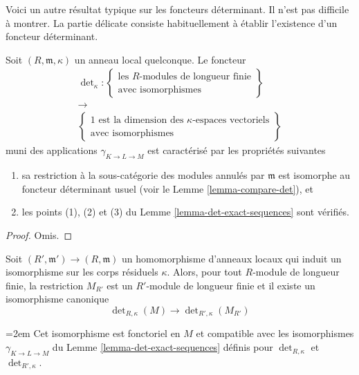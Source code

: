 \medskip\noindent
Voici un autre résultat typique sur les foncteurs déterminant.
Il n'est pas difficile à montrer. La partie délicate consiste habituellement à établir
l'existence d'un foncteur déterminant.

\begin{lemma}
\label{lemma-uniqueness-det}
Soit $(R, \mathfrak m, \kappa)$ un anneau local quelconque.
Le foncteur
$$
\begin{gathered}
\det\nolimits_\kappa :
\left\{
\begin{matrix}
\text{les }R\text{-modules de longueur finie} \\
\text{avec isomorphismes}
\end{matrix}
\right\} \\
\longrightarrow \\
\left\{
\begin{matrix}
1\text{ est la dimension des }\kappa\text{-espaces vectoriels} \\
\text{avec isomorphismes}
\end{matrix}
\right\}
\end{gathered}
$$
muni des applications $\gamma_{K \to L \to M}$ est caractérisé par
les propriétés suivantes
\begin{enumerate}
\item sa restriction à la sous-catégorie des modules annulés
par $\mathfrak m$ est isomorphe au foncteur déterminant usuel
(voir le Lemme \ref{lemma-compare-det}), et
\item les points (1), (2) et (3) du Lemme \ref{lemma-det-exact-sequences}
sont vérifiés.
\end{enumerate}
\end{lemma}

\begin{proof}
Omis.
\end{proof}

\begin{lemma}
\label{lemma-determinant-quotient-ring}
Soit $(R', \mathfrak m') \to (R, \mathfrak m)$ un homomorphisme d'anneaux
locaux qui induit un isomorphisme sur les corps résiduels $\kappa$.
Alors, pour tout $R$-module de longueur finie, la restriction $M_{R'}$
est un $R'$-module de longueur finie et il existe un isomorphisme canonique
$$
\det\nolimits_{R, \kappa}(M)
\longrightarrow
\det\nolimits_{R', \kappa}(M_{R'})
$$
{\emergencystretch=2em Cet isomorphisme est fonctoriel en $M$ et compatible avec les
isomorphismes $\gamma_{K \to L \to M}$ du Lemme \ref{lemma-det-exact-sequences}
définis pour $\det_{R, \kappa}$ et $\det_{R', \kappa}$.\par}
\end{lemma}

